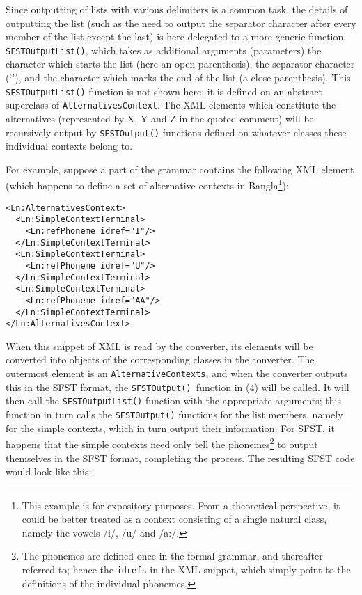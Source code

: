 Since outputting of lists with various delimiters is a common task, the details of outputting the list (such as the need to output the separator character after every member of the list except the last) is here delegated to a more generic function, \texttt{SFSTOutputList()}, which takes as additional arguments (parameters) the character which starts the list (here an open parenthesis), the separator character (`{\textbar}'), and the character which marks the end of the list (a close parenthesis). This \texttt{SFSTOutputList()} function is not shown here; it is defined on an abstract superclass of \texttt{AlternativesContext}. The XML elements which constitute the alternatives (represented by X, Y and Z in the quoted comment) will be recursively output by \texttt{SFSTOutput()} functions defined on whatever classes these individual contexts belong to.

For example, suppose a part of the grammar contains the following XML element (which happens to define a set of alternative contexts in Bangla\footnote{This
  example is for expository purposes. From a theoretical perspective, it could be better treated as a context consisting of a single natural class, namely the vowels /i/, /u/ and /a:/.}):

\ea
\begin{verbatim}
<Ln:AlternativesContext>
  <Ln:SimpleContextTerminal>
    <Ln:refPhoneme idref="I"/>
  </Ln:SimpleContextTerminal>
  <Ln:SimpleContextTerminal>
    <Ln:refPhoneme idref="U"/>
  </Ln:SimpleContextTerminal>
  <Ln:SimpleContextTerminal>
    <Ln:refPhoneme idref="AA"/>
  </Ln:SimpleContextTerminal>
</Ln:AlternativesContext>
\end{verbatim}
\z

When this snippet of XML is read by the converter, its elements will be converted into objects of the corresponding classes in the converter. The outermost element is an \texttt{AlternativeContexts}, and when the converter outputs this in the SFST format, the \texttt{SFSTOutput()}\texttt{ }function in (4) will be called. It will then call the \texttt{SFSTOutputList()} function with the appropriate arguments; this function in turn calls the \texttt{SFSTOutput()} functions for the list members, namely for the simple contexts, which in turn output their information. For SFST, it happens that the simple contexts need only tell the phonemes\footnote{The
  phonemes are defined once in the formal grammar, and thereafter referred to; hence the \texttt{idrefs} in the XML snippet, which simply point to the definitions of the individual phonemes.} to output themselves in the SFST format, completing the process. The resulting SFST code would look like this:

